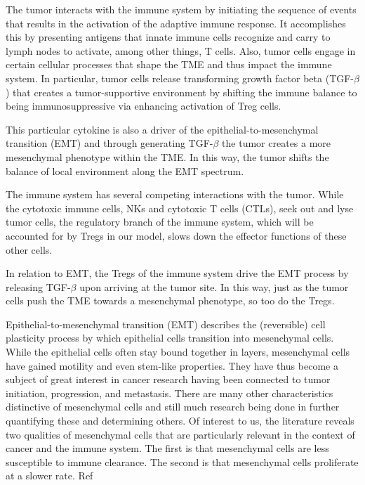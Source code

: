 \documentclass{article}
\begin{document}
The tumor interacts with the immune system by initiating the sequence of events that results in the activation of the adaptive immune response.
It accomplishes this by presenting antigens that innate immune cells recognize and carry to lymph nodes to activate, among other things, T cells.
Also, tumor cells engage in certain cellular processes that shape the TME and thus impact the immune system.
In particular, tumor cells release transforming growth factor beta (TGF-$\beta$) that creates a tumor-supportive environment by shifting the immune balance to being immunosuppressive via enhancing activation of Treg cells.

This particular cytokine is also a driver of the epithelial-to-mesenchymal transition (EMT) and through generating TGF-$\beta$ the tumor creates a more mesenchymal phenotype within the TME.
In this way, the tumor shifts the balance of local environment along the EMT spectrum.

The immune system has several competing interactions with the tumor.
While the cytotoxic immune cells, NKs and cytotoxic T cells (CTLs), seek out and lyse tumor cells, the regulatory branch of the immune system, which will be accounted for by Tregs in our model, slows down the effector functions of these other cells.

In relation to EMT, the Tregs of the immune system drive the EMT process by releasing TGF-$\beta$ upon arriving at the tumor site\cite{terry2017new}.
In this way, just as the tumor cells push the TME towards a mesenchymal phenotype, so too do the Tregs.

Epithelial-to-mesenchymal transition (EMT) describes the (reversible) cell plasticity process by which epithelial cells transition into mesenchymal cells.
While the epithelial cells often stay bound together in layers, mesenchymal cells have gained motility and even stem-like properties\cite{nieto2016emt}.
They have thus become a subject of great interest in cancer research having been connected to tumor initiation, progression, and metastasis\cite{nieto2016emt}.
There are many other characteristics distinctive of mesenchymal cells and still much research being done in further quantifying these and determining others.
Of interest to us, the literature reveals two qualities of mesenchymal cells that are particularly relevant in the context of cancer and the immune system.
The first is that mesenchymal cells are less susceptible to immune clearance\cite{terry2017new}. 
%
The second is that mesenchymal cells proliferate at a slower rate. Ref
\end{document}
